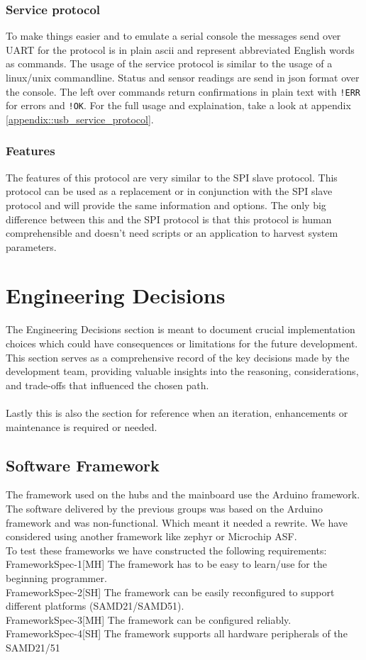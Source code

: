\subsubsection{Service protocol}
To make things easier and to emulate a serial console the messages send over UART for the protocol is in plain ascii and represent abbreviated English words as commands. The usage of the service protocol is similar to the usage of a linux/unix commandline. Status and sensor readings are send in json format over the console. The left over commands return confirmations in plain text with \texttt{!ERR} for errors and \texttt{!OK}. For the full usage and explaination, take a look at appendix \ref{appendix::usb_service_protocol}.

\subsubsection{Features}
The features of this protocol are very similar to the SPI slave protocol. This protocol can be used as a replacement or in conjunction with the SPI slave protocol and will provide the same information and options. The only big difference between this and the SPI protocol is that this protocol is human comprehensible and doesn't need scripts or an application to harvest system parameters. 


\section{Engineering Decisions}
The Engineering Decisions section is meant to document crucial implementation choices which could have consequences or limitations for the future development. \\ 
This section serves as a comprehensive record of the key decisions made by the development team, providing valuable insights into the reasoning, considerations, and trade-offs that influenced the chosen path.\\\\
Lastly this is also the section for reference when an iteration, enhancements or maintenance is required or needed.
\subsection{Software Framework}
The framework used on the hubs and the mainboard use the Arduino framework. The software delivered by the previous groups was based on the Arduino framework and was non-functional. Which meant it needed a rewrite. We have considered using another framework like zephyr or Microchip ASF. \\To test these frameworks we have constructed the following requirements:\\
FrameworkSpec-1[MH] The framework has to be easy to learn/use for the beginning programmer. \\
FrameworkSpec-2[SH] The framework can be easily reconfigured to support different platforms (SAMD21/SAMD51).\\
FrameworkSpec-3[MH] The framework can be configured reliably.\\
FrameworkSpec-4[SH] The framework supports all hardware peripherals of the SAMD21/51\\
\pagebreak

